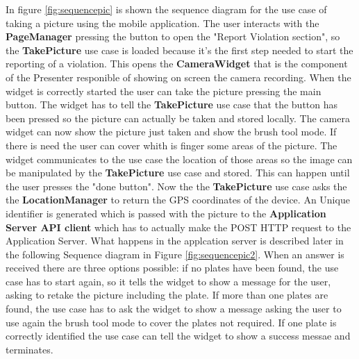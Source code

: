 In figure \ref{fig:sequencepic} is shown the sequence diagram for the use case of taking a picture using the mobile application.
The user interacts with the \textbf{PageManager} pressing the button to open the "Report Violation section", so the \textbf{TakePicture} use case is loaded because it's the first step needed to start the reporting of a violation. This opens the \textbf{CameraWidget} that is the component of the Presenter responible of showing on screen the camera recording. When the widget is correctly started the user can take the picture pressing the main button. The widget has to tell the \textbf{TakePicture} use case that the button has been pressed so the picture can  actually be taken and stored locally. The camera widget can now show the picture just taken and show the brush tool mode. If there is need the user can cover whith is finger some areas of the picture. The widget communicates to the use case the location of those areas so the image can be manipulated by the \textbf{TakePicture} use case and stored. This can happen until the user presses the "done button". Now the the \textbf{TakePicture} use case asks the the \textbf{LocationManager} to return the GPS coordinates of the device. An Unique identifier is generated which is passed with the picture to the \textbf{Application Server API client} which has to actually make the POST HTTP request to the Application Server. What happens in the applcation server is described later in the following Sequence diagram in Figure \ref{fig:sequencepic2}.
When an answer is received there are three options possible: if no plates have been found, the use case has to start again, so it tells the widget to show a message for the user, asking to retake the picture including the plate.
If more than one plates are found, the use case has to ask the widget to show a message asking the user to use again the brush tool mode to cover the plates not required. If one plate is correctly identified the use case can tell the widget to show a success messae and terminates. %


